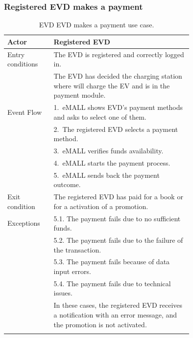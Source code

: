 \subsubsection*{Registered EVD makes a payment}
\begin{center}
    \begin{longtable}{lp{0.75\linewidth}}
        \hline
        Actor            & Registered EVD                                                                                                        \\
        \hline
        Entry conditions & The EVD is registered and correctly logged in.                                                                        \\
        & The EVD has decided the charging station where will charge the EV and is in the payment module.                       \\
        \hline
        Event Flow       & 1.\ eMALL shows EVD's payment methods and asks to select one of them.                                                 \\
        & 2.\ The registered EVD selects a payment method.                                                                      \\
        & 3.\ eMALL verifies funds availability.                                                                                \\
        & 4.\ eMALL starts the payment process.                                                                                 \\
        & 5.\ eMALL sends back the payment outcome.                                                                             \\
        \hline
        Exit condition   & The registered EVD has paid for a book or for a activation of a promotion.                                            \\
        \hline
        Exceptions       & 5.1. The payment fails due to no sufficient funds.                                                                    \\
        & 5.2. The payment fails due to the failure of the transaction.                                                         \\
        & 5.3. The payment fails because of data input errors.                                                                  \\
        & 5.4. The payment fails due to technical issues.                                                                       \\
        & In these cases, the registered EVD receives a notification with an error message, and the promotion is not activated. \\
        \hline
        \caption{EVD EVD makes a payment use case.}
        \label{tab: EVD_pays_use_case}
    \end{longtable}
\end{center}


